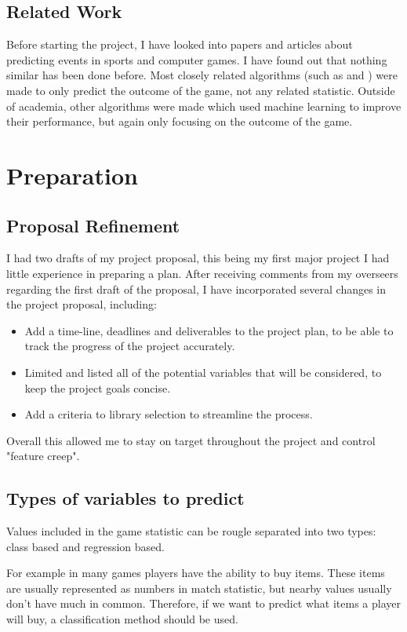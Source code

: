 \documentclass[12pt,a4paper]{book}
\begin{document}
\section{Related Work}
Before starting the project, I have looked into papers and articles about predicting events in sports and computer games.
I have found out that nothing similar has been done before.
Most closely related algorithms (such as \cite{trueskill} and \cite{bayesianranking}) were made to only predict the outcome of the game, not any related statistic.
Outside of academia, other algorithms were made which used machine learning to improve their performance, but again only focusing on the outcome of the game.


\chapter{Preparation}
\section{Proposal Refinement}
I had two drafts of my project proposal, this being my first major project I had little experience in preparing a plan.
After receiving comments from my overseers regarding the first draft of the proposal, I have incorporated several changes in the project proposal, including:
\begin{itemize}
\item Add a time-line, deadlines and deliverables to the project plan, to be able to track the progress of the project accurately.
\item Limited and listed all of the potential variables that will be considered, to keep the project goals concise.
\item Add a criteria to library selection to streamline the process.
\end{itemize}
Overall this allowed me to stay on target throughout the project and control "feature creep".
\section{Types of variables to predict}
Values included in the game statistic can be rougle separated into two types: class based and regression based.

For example in many games players have the ability to buy items.
These items are usually represented as numbers in match statistic, but nearby values usually don't have much in common.
Therefore, if we want to predict what items a player will buy, a classification method should be used.
\end{document}
